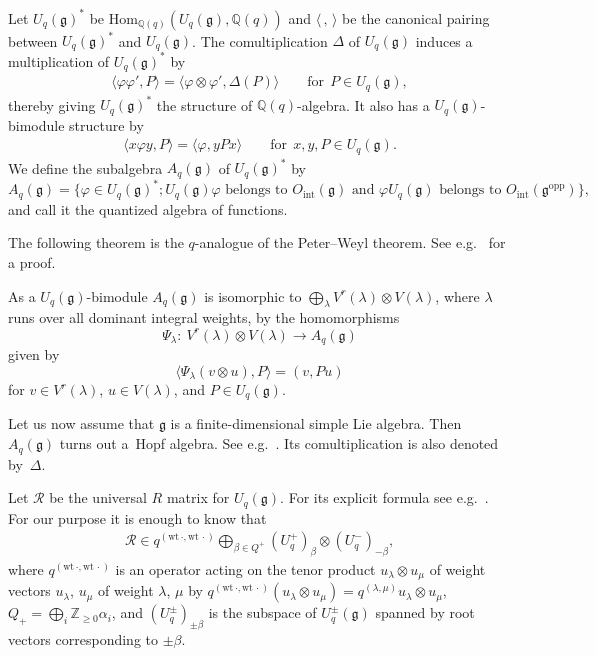 \documentclass[pdftex]{sigma}
\newcommand{\geh}{\mathfrak{g}}
\newcommand{\la}{\lambda}
\newcommand{\ot}{\otimes}
\newcommand{\pair}[1]{\langle{#1}\rangle}
\newcommand{\Z}{{\mathbb Z}}
\newcommand{\Q}{{\mathbb Q}}
\begin{document}
Let $U_q(\geh)^*$ be $\mathrm{Hom}_{\Q(q)}(U_q(\geh),\Q(q))$ and $\pair{\,,\,}$ be the canonical
pairing between $U_q(\geh)^*$ and $U_q(\geh)$. The comultiplication $\Delta$ of $U_q(\geh)$ induces
a multiplication of $U_q(\geh)^*$ by
\begin{gather}\label{eq:mult}
\pair{\varphi\varphi',P}=\pair{\varphi\otimes\varphi',\Delta(P)}\qquad\text{for} \ \ P\in U_q(\geh),
\end{gather}
thereby giving $U_q(\geh)^*$ the structure of $\Q(q)$-algebra. It also has a $U_q(\geh)$-bimodule structure
by
\begin{gather}\label{eq:bimodule}
\pair{x\varphi y,P}=\pair{\varphi,yPx}\qquad\text{for} \ \ x,y,P\in U_q(\geh).
\end{gather}
We def\/ine the subalgebra $A_q(\geh)$ of $U_q(\geh)^*$ by
\[
A_q(\geh)=\big\{\varphi\in U_q(\geh)^*;U_q(\geh)\varphi\text{ belongs to }O_\mathrm{int}(\geh)\text{ and }
\varphi U_q(\geh)\text{ belongs to }O_\mathrm{int}(\geh^\mathrm{opp})\big\},
\]
and call it the quantized algebra of functions.

The following theorem is the $q$-analogue of the Peter--Weyl theorem.
See e.g.~\cite{Kas93}  for a proof.

\begin{theorem}\label{th:peter}
As a $U_q(\geh)$-bimodule $A_q(\geh)$ is isomorphic to $\bigoplus_\la V^r(\la)\ot V(\la)$, where $\la$ runs
over all dominant integral weights, by the homomorphisms
\[
\Psi_\la: \ V^r(\la)\ot V(\la)\rightarrow A_q(\geh)
\]
given by
\[
\langle \Psi_\la(v\ot u),P\rangle = (v,Pu)
\]
for $v\in V^r(\la)$, $u\in V(\la)$, and $P\in U_q(\geh)$.
\end{theorem}

Let us now assume that $\geh$ is a f\/inite-dimensional simple Lie algebra. Then $A_q(\geh)$ turns out
a~Hopf algebra. See e.g.~\cite[Chapter~9]{Joseph}. Its comultiplication is also denoted by~$\Delta$.

Let $\mathcal{R}$ be the
universal $R$ matrix for $U_q(\geh)$. For its explicit formula see e.g.~\cite[p.~273]{CPbook}. For our purpose
it is enough to know that
\begin{gather}\label{eq:univR}
\mathcal{R}\in q^{(\text{wt}\,\cdot,\text{wt}\,\cdot)}
\bigoplus_{\beta\in Q^+}(U_q^+)_\beta\ot(U_q^-)_{-\beta},
\end{gather}
where $q^{(\text{wt}\,\cdot,\text{wt}\,\cdot)}$ is an operator acting on
the tenor product $u_\la\ot u_\mu$ of weight vectors $u_\la$, $u_\mu$ of weight $\la$, $\mu$ by
$q^{(\text{wt}\,\cdot,\text{wt}\,\cdot)}(u_\la\ot u_\mu)=q^{(\la,\mu)}
u_\la\ot u_\mu$, $Q_+=\bigoplus_i\Z_{\ge0}\alpha_i$, and $(U_q^\pm)_{\pm\beta}$ is the subspace of
$U_q^\pm(\geh)$ spanned by root vectors corresponding to $\pm\beta$.
\end{document}
